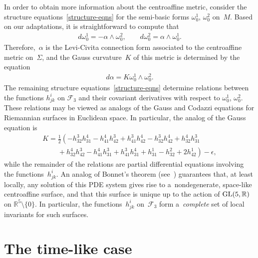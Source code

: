 \documentclass[10pt,a4paper]{amsart}
\numberwithin{equation}{section}
\theoremstyle{definition}
\begin{document}
In order to obtain more information about the centroaf\/f\/ine metric, consider the structure
equations~\eqref{structure-eqns} for the semi-basic forms $\omega^1_0$, $\omega^2_0$ on~$M$.
Based on our adaptations, it is straightforward to compute that
\begin{gather*}
d\omega^1_0 = -\alpha \wedge \omega^2_0,
\qquad
d\omega^2_0 = \alpha \wedge \omega^1_0.
\end{gather*}
Therefore,~$\alpha$ is the Levi-Civita connection form associated to the centroaf\/f\/ine metric on~$\Sigma$, and the Gauss
curvature~$K$ of this metric is determined by the equation
\begin{gather*}
d\alpha = K  \omega^1_0 \wedge \omega^2_0.
\end{gather*}
The remaining structure equations~\eqref{structure-eqns} determine relations between the functions $h^i_{jk}$ on
$\mathcal{F}_3$ and their covariant derivatives with respect to $\omega^1_0$, $\omega^2_0$.
These relations may be viewed as analogs of the Gauss and Codazzi equations for Riemannian surfaces in Euclidean space.
In particular, the analog of the Gauss equation is
\begin{gather}
K = \tfrac{1}{2}\left(-h^3_{32} h^4_{31} - h^4_{41} h^3_{42} + h^3_{41} h^4_{42} - h^3_{32} h^4_{42} + h^4_{32}
h^3_{31} \right.
\nonumber
\\
\left.\phantom{K=}{}
+ h^4_{32} h^3_{42} - h^4_{41} h^3_{31} + h^3_{41} h^4_{31} + h^1_{31} - h^2_{32} + 2h^1_{42} \right) - \epsilon,
\label{space-like-Gauss-eqn}
\end{gather}
while the remainder of the relations are partial dif\/ferential equations involving the func\-tions~$h^i_{jk}$.
An analog of Bonnet's theorem (see~\cite{Griffiths74}) guarantees that, at least locally, any solution of this PDE
system gives rise to a~nondegenerate, space-like centroaf\/f\/ine surface, and that this surface is unique up to the action
of ${\rm GL}(5,\mathbb{R})$ on $\mathbb{R}^5 \setminus \{0 \}$.
In particular, the functions~$h^i_{jk}$ on~$\mathcal{F}_3$ form a~{\em complete} set of local invariants for such
surfaces.

\section{The time-like case}\label{time-like-sec}
\end{document}

